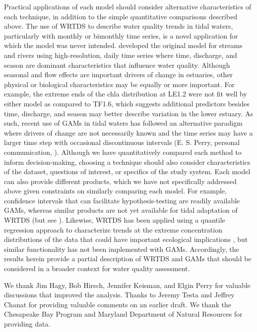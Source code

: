 \documentclass{svjour3}\usepackage[]{graphicx}\usepackage[]{color}
\begin{document}
Practical applications of each model should consider alternative characteristics of each technique, in addition to the simple quantitative comparisons described above.  The use of \ac{WRTDS} to describe water quality trends in tidal waters, particularly with monthly or bimonthly time series, is a novel application for which the model was never intended.  \cite{Hirsch10} developed the original model for streams and rivers using high-resolution, daily time series where time, discharge, and season are dominant characteristics that influence water quality.  Although seasonal and flow effects are important drivers of change in estuaries, other physical or biological characteristics may be equally or more important.  For example, the extreme ends of the \ac{chla} distribution at LE1.2 were not fit well by either model as compared to TF1.6, which suggests additional predictors besides time, discharge, and season may better describe variation in the lower estuary.  As such, recent use of \acp{GAM} in tidal waters has followed an alternative paradigm where drivers of change are not necessarily known and the time series may have a larger time step with occasional discontinuous intervals (E. S. Perry, personal communication, \cite{Harding15}).  Although we have quantitatively compared each method to inform decision-making, choosing a technique should also consider characteristics of the dataset, questions of interest, or specifics of the study system.  Each model can also provide different products, which we have not specifically addressed above given constraints on similarly comparing each model.  For example, confidence intervals that can facilitate hypothesis-testing are readily available \acp{GAM}, whereas similar products are not yet available for tidal adaptation of \ac{WRTDS} (but see \cite{Hirsch15}).  Likewise, \ac{WRTDS} has been applied using a quantile regression approach to characterize trends at the extreme concentration distributions of the data that could have important ecological implications \cite{Beck15}, but similar functionality has not been implemented with \acp{GAM}.  Accordingly, the results herein provide a partial description of \ac{WRTDS} and \acp{GAM} that should be considered in a broader context for water quality assessment.

\begin{acknowledgements}
We thank Jim Hagy, Bob Hirsch, Jennifer Keisman, and Elgin Perry for valuable discussions that improved the analysis.  Thanks to Jeremy Testa and Jeffrey Chanat for providing valuable comments on an earlier draft.  We thank the Chesapeake Bay Program and Maryland Department of Natural Resources for providing data.
\end{acknowledgements}
\end{document}
